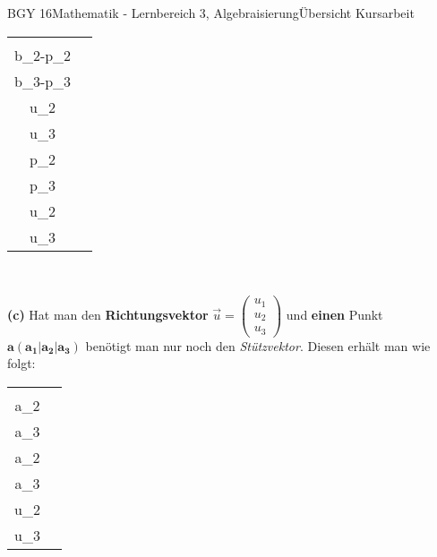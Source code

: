 \documentclass[oneside,openany,headings=optiontotoc,11pt,numbers=noenddot]{scrreprt}
\begin{document}
\begin{worksheet}{BGY 16}{Mathematik - Lernbereich 3, Algebraisierung}{Übersicht Kursarbeit}
\begin{framed}
			\par\noindent
			\begin{tabularx}{\textwidth}{cc}
				\(\vec{u} = \left(\begin{array}{c}b_1-p_1\\b_2-p_2\\b_3-p_3\end{array}\right) = \underbrace{\left(\begin{array}{c}u_1\\u_2\\u_3\end{array}\right)}_{Richtungsvektor}\) & \(\Rightarrow \mathbf{g:} \vec{x} \mathbf{= \left(\begin{array}{c}p_1\\p_2\\p_3\end{array}\right) + r*\left(\begin{array}{c}u_1\\u_2\\u_3\end{array}\right)}\)
			\end{tabularx}\\
			\par\bigskip\noindent
			\textbf{(c)} Hat man den \textbf{Richtungsvektor} \(\vec{u} = \left(\begin{array}{c}u_1\\u_2\\u_3\end{array}\right)\) und \textbf{einen} Punkt \(\mathbf{a (a_1|a_2|a_3)}\) benötigt man nur noch den \textit{Stützvektor}. Diesen erhält man wie folgt:\\
			\par\noindent
			\begin{tabularx}{\textwidth}{cc}
				\(\vec{p} = \underbrace{\left(\begin{array}{c}a_1\\a_2\\a_3\end{array}\right)}_{Stützvektor}\) & \(\Rightarrow \mathbf{g:} \vec{x} \mathbf{= \left(\begin{array}{c}a_1\\a_2\\a_3\end{array}\right) + r*\left(\begin{array}{c}u_1\\u_2\\u_3\end{array}\right)}\)
			\end{tabularx}\\

\end{framed}
\end{worksheet}
\end{document}
